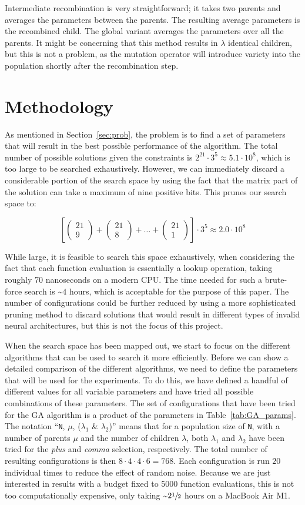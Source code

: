 \documentclass{article}
\newcommand{\tochoose}[1]{\begin{pmatrix} 21 \\ #1 \end{pmatrix}}
\begin{document}
Intermediate recombination is very straightforward; it takes two parents and averages the parameters between the parents.
The resulting average parameters is the recombined child.
The global variant averages the parameters over all the parents.
It might be concerning that this method results in $\lambda$ identical children, but this is not a problem, as the mutation operator will introduce variety into the population shortly after the recombination step.


\section{Methodology}
\label{sec:meth}

As mentioned in Section~\ref{sec:prob}, the problem is to find a set of parameters that will result in the best possible performance of the algorithm.
The total number of possible solutions given the constraints is $2^{21} \cdot 3^5 \approx 5.1 \cdot 10^8$, which is too large to be searched exhaustively.
However, we can immediately discard a considerable portion of the search space by using the fact that the matrix part of the solution can take a maximum of nine positive bits.
This prunes our search space to:

$$\left[ \tochoose{9} + \tochoose{8} + \dots + \tochoose{1}\right]\cdot 3^5 \approx 2.0 \cdot 10^8 $$

While large, it is feasible to search this space exhaustively, when considering the fact that each function evaluation is essentially a lookup operation, taking roughly $70$ nanoseconds on a modern CPU.
The time needed for such a brute-force search is \textasciitilde $4$ hours, which is acceptable for the purpose of this paper.
The number of configurations could be further reduced by using a more sophisticated pruning method to discard solutions that would result in different types of invalid neural architectures, but this is not the focus of this project.

When the search space has been mapped out, we start to focus on the different algorithms that can be used to search it more efficiently.
Before we can show a detailed comparison of the different algorithms, we need to define the parameters that will be used for the experiments.
To do this, we have defined a handful of different values for all variable parameters and have tried all possible combinations of these parameters.
The set of configurations that have been tried for the GA algorithm is a product of the parameters in Table~\ref{tab:GA_params}.
The notation ``\texttt{N}, $\mu$, ($\lambda_{1}$ \& $\lambda_{2}$)'' means that for a population size of \texttt{N}, with a number of parents $\mu$ and the number of children $\lambda$, both $\lambda_{1}$ and $\lambda_{2}$ have been tried for the \textit{plus} and \textit{comma} selection, respectively.
The total number of resulting configurations is then $8 \cdot 4 \cdot 4 \cdot 6 = 768$.
Each configuration is run $20$ individual times to reduce the effect of random noise.
Because we are just interested in results with a budget fixed to 5000 function evaluations, this is not too computationally expensive, only taking \textasciitilde $2\sfrac{1}{2}$ hours on a MacBook Air M1.
\end{document}
